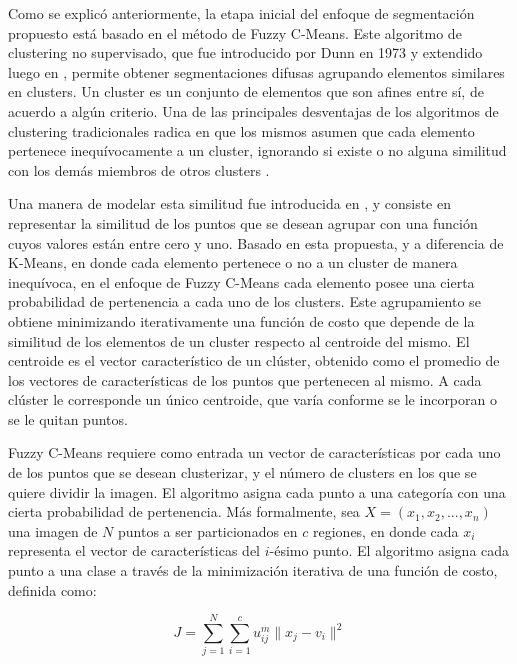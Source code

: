 \label{Introduccion}

Como se explicó anteriormente, la etapa inicial del enfoque de segmentación propuesto está basado en el método de Fuzzy C-Means. Este algoritmo de clustering no supervisado, que fue introducido por Dunn en 1973 \citep{dunn1973fuzzy} y extendido luego en \citep{bezdek1984fcm}, permite obtener segmentaciones difusas agrupando elementos similares en clusters. Un cluster es un conjunto de elementos que son afines entre sí, de acuerdo a algún criterio. Una de las principales desventajas de los algoritmos de clustering tradicionales radica en que los mismos asumen que cada elemento pertenece inequívocamente a un cluster, ignorando si existe o no alguna similitud con los demás miembros de otros clusters \citep{full1982fuzzy}.
 
Una manera de modelar esta similitud fue introducida en \citep{zadeh1965fuzzy}, y consiste en representar la similitud de los puntos que se desean agrupar con una función cuyos valores están entre cero y uno. Basado en esta propuesta, y a diferencia de K-Means, en donde cada elemento pertenece o no a un cluster de manera inequívoca, en el enfoque de Fuzzy C-Means cada elemento posee una cierta probabilidad de pertenencia a cada uno de los clusters. Este agrupamiento se obtiene minimizando iterativamente una función de costo que depende de la similitud de los elementos de un cluster respecto al centroide del mismo. El centroide es el vector característico de un clúster, obtenido como el promedio de los vectores de características de los puntos que pertenecen al mismo. A cada clúster le corresponde un único centroide, que varía conforme se le incorporan o se le quitan puntos.

Fuzzy C-Means requiere como entrada un vector de características por cada uno de los puntos que se desean clusterizar, y el número de clusters en los que se quiere dividir la imagen. El algoritmo asigna cada punto a una categoría con una cierta probabilidad de pertenencia. Más formalmente, sea $ X = (x_1, x_2, ..., x_n)$ una imagen de $N$ puntos a ser particionados en $c$ regiones, en donde cada $x_i$ representa el vector de características del $i$-ésimo punto. El algoritmo asigna cada punto a una clase a través de la minimización iterativa de una función de costo, definida como:

\[ J = \sum_{j=1}^{N} \sum_{i=1}^{c} u_{ij}^m \lVert x_j- v_i \rVert^2 \]


